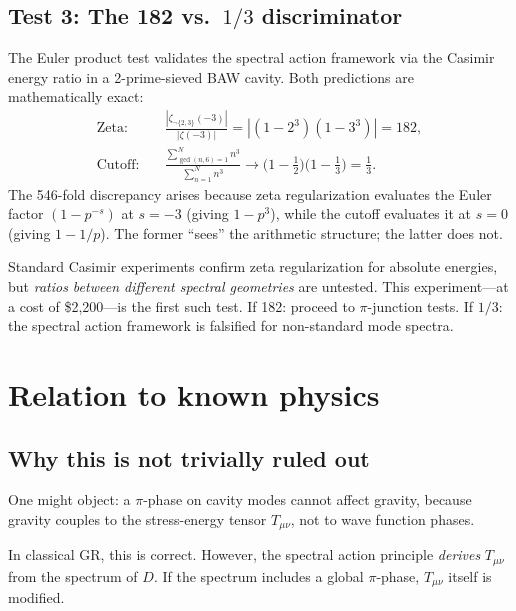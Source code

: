 \documentclass[aps,prl,twocolumn,superscriptaddress,nofootinbib]{revtex4-2}
\begin{document}
\subsection{Test 3: The 182 vs.\ $1/3$ discriminator}

The Euler product test validates the spectral action framework
via the Casimir energy ratio in a 2-prime-sieved BAW cavity.
Both predictions are mathematically exact:
\begin{align}
  \text{Zeta:} \quad &
  \frac{|\zeta_{\neg\{2,3\}}(-3)|}{|\zeta(-3)|}
  = |(1 - 2^3)(1 - 3^3)| = 182, \\
  \text{Cutoff:} \quad &
  \frac{\sum_{\gcd(n,6)=1}^N n^3}{\sum_{n=1}^N n^3}
  \to \bigl(1 - \tfrac{1}{2}\bigr)\bigl(1 - \tfrac{1}{3}\bigr) = \tfrac{1}{3}.
\end{align}
The 546-fold discrepancy arises because zeta regularization evaluates
the Euler factor $(1 - p^{-s})$ at $s = -3$ (giving $1 - p^3$),
while the cutoff evaluates it at $s = 0$ (giving $1 - 1/p$).
The former ``sees'' the arithmetic structure; the latter does not.

Standard Casimir experiments confirm zeta regularization for
absolute energies, but \emph{ratios between different spectral
geometries} are untested.
This experiment---at a cost of \$2{,}200---is the first such test.
If 182: proceed to $\pi$-junction tests.
If $1/3$: the spectral action framework is falsified for
non-standard mode spectra.

\section{Relation to known physics}

\subsection{Why this is not trivially ruled out}

One might object: a $\pi$-phase on cavity modes cannot affect gravity,
because gravity couples to the stress-energy tensor $T_{\mu\nu}$,
not to wave function phases.

In classical GR, this is correct.
However, the spectral action principle \emph{derives} $T_{\mu\nu}$
from the spectrum of $D$.
If the spectrum includes a global $\pi$-phase,
$T_{\mu\nu}$ itself is modified.
\end{document}
